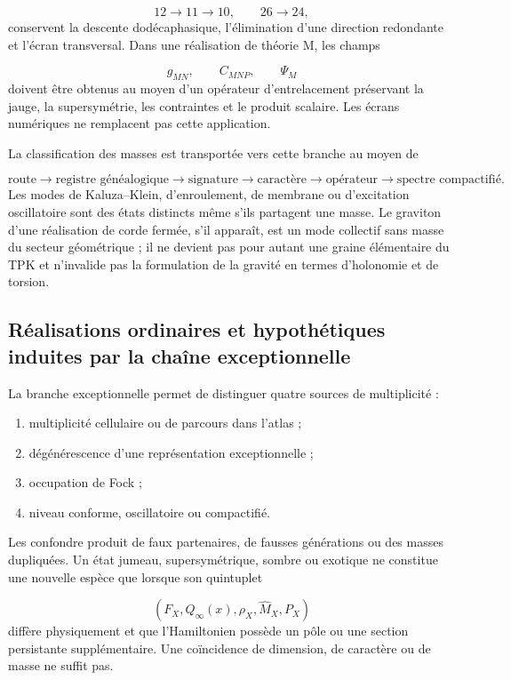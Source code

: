 \[
12\longrightarrow11\longrightarrow10,
\qquad
26\longrightarrow24,
\]
conservent la descente dodécaphasique, l’élimination d’une direction redondante et l’écran transversal. Dans une réalisation de théorie M, les champs

\[
g_{MN},\qquad C_{MNP},\qquad\Psi_M
\]
doivent être obtenus au moyen d’un opérateur d’entrelacement préservant la jauge, la supersymétrie, les contraintes et le produit scalaire. Les écrans numériques ne remplacent pas cette application.

La classification des masses est transportée vers cette branche au moyen de

\[
\text{route}
\longrightarrow\text{registre généalogique}
\longrightarrow\text{signature}
\longrightarrow\text{caractère}
\longrightarrow\text{opérateur}
\longrightarrow\text{spectre compactifié}.
\]
Les modes de Kaluza--Klein, d’enroulement, de membrane ou d’excitation oscillatoire sont des états distincts même s’ils partagent une masse. Le graviton d’une réalisation de corde fermée, s’il apparaît, est un mode collectif sans masse du secteur géométrique ; il ne devient pas pour autant une graine élémentaire du TPK et n’invalide pas la formulation de la gravité en termes d’holonomie et de torsion.

\subsection{Réalisations ordinaires et hypothétiques induites par la chaîne exceptionnelle}
La branche exceptionnelle permet de distinguer quatre sources de multiplicité :

\begin{enumerate}
\item multiplicité cellulaire ou de parcours dans l’atlas ;
\item dégénérescence d’une représentation exceptionnelle ;
\item occupation de Fock ;
\item niveau conforme, oscillatoire ou compactifié.
\end{enumerate}
Les confondre produit de faux partenaires, de fausses générations ou des masses dupliquées. Un état jumeau, supersymétrique, sombre ou exotique ne constitue une nouvelle espèce que lorsque son quintuplet

\[
(F_X,Q_\infty(x),\rho_X,\widehat M_X,P_X)
\]
diffère physiquement et que l’Hamiltonien possède un pôle ou une section persistante supplémentaire. Une coïncidence de dimension, de caractère ou de masse ne suffit pas.

